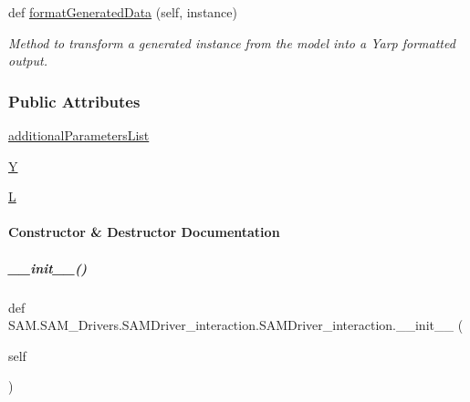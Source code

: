 \begin{DoxyCompactItemize}
def \hyperlink{group__icubclient__SAM__Drivers_af99e275c9f691489b795d33d52b4bbfc}{format\+Generated\+Data} (self, instance)
\begin{DoxyCompactList}\small\item\em Method to transform a generated instance from the model into a Yarp formatted output. \end{DoxyCompactList}\end{DoxyCompactItemize}
\subsubsection*{Public Attributes}
\begin{DoxyCompactItemize}
\item 
\hyperlink{group__icubclient__SAM__Drivers_ad156c110c349c2170f6ac74ef98d9d5d}{additional\+Parameters\+List}
\item 
\hyperlink{group__icubclient__SAM__Drivers_adba94f830ec5b368df923f19d1cb4e89}{Y}
\item 
\hyperlink{group__icubclient__SAM__Drivers_adaed67c0fbe44b2e7acd9719fe56f0ee}{L}
\end{DoxyCompactItemize}


\paragraph{Constructor \& Destructor Documentation}
\mbox{\label{group__icubclient__SAM__Drivers_afae51ba28a26b423b2607e6cafa8ef3b}} 
\subparagraph{\texorpdfstring{\+\_\+\+\_\+init\+\_\+\+\_\+()}{\_\_init\_\_()}}
{\footnotesize\ttfamily def S\+A\+M.\+S\+A\+M\+\_\+\+Drivers.\+S\+A\+M\+Driver\+\_\+interaction.\+S\+A\+M\+Driver\+\_\+interaction.\+\_\+\+\_\+init\+\_\+\+\_\+ (\begin{DoxyParamCaption}\item[{}]{self }\end{DoxyParamCaption})}



